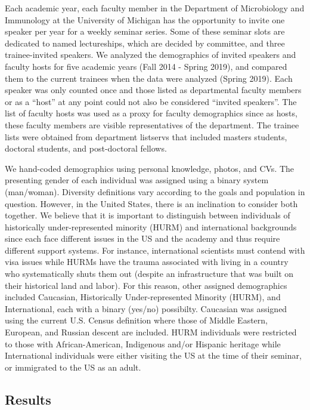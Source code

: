\documentclass[10pt,]{article}
\begin{document}
Each academic year, each faculty member in the Department of
Microbiology and Immunology at the University of Michigan has the
opportunity to invite one speaker per year for a weekly seminar series.
Some of these seminar slots are dedicated to named lectureships, which
are decided by committee, and three trainee-invited speakers. We
analyzed the demographics of invited speakers and faculty hosts for five
academic years (Fall 2014 - Spring 2019), and compared them to the
current trainees when the data were analyzed (Spring 2019). Each speaker
was only counted once and those listed as departmental faculty members
or as a ``host'' at any point could not also be considered ``invited
speakers''. The list of faculty hosts was used as a proxy for faculty
demographics since as hosts, these faculty members are visible
representatives of the department. The trainee lists were obtained from
department listservs that included masters students, doctoral students,
and post-doctoral fellows.

We hand-coded demographics using personal knowledge, photos, and CVs.
The presenting gender of each individual was assigned using a binary
system (man/woman). Diversity definitions vary according to the goals
and population in question. However, in the United States, there is an
inclination to consider both together. We believe that it is important
to distinguish between individuals of historically under-represented
minority (HURM) and international backgrounds since each face different
issues in the US and the academy and thus require different support
systems. For instance, international scientists must contend with visa
issues while HURMs have the trauma associated with living in a country
who systematically shuts them out (despite an infrastructure that was
built on their historical land and labor). For this reason, other
assigned demographics included Caucasian, Historically Under-represented
Minority (HURM), and International, each with a binary (yes/no)
possibilty. Caucasian was assigned using the current U.S. Census
definition where those of Middle Eastern, European, and Russian descent
are included. HURM individuals were restricted to those with
African-American, Indigenous and/or Hispanic heritage while
International individuals were either visiting the US at the time of
their seminar, or immigrated to the US as an adult.

\subsection{Results}\label{results}
\end{document}
